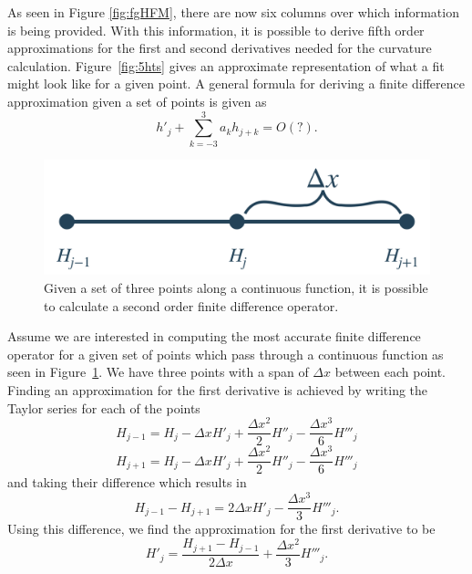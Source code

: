 As seen in Figure \ref{fig:fgHFM}, there are now six columns over which information is being provided. With this information, it is possible to derive fifth order approximations for the first and second derivatives needed for the curvature calculation. Figure~\ref{fig:5hts} gives an approximate representation of what a fit might look like for a given point. A general formula for deriving a finite difference approximation given a set of points is given as 
\begin{equation}
h'_j + \sum_{k=-3}^{3} a_k h_{j+k} = O(?).
\label{eqn:gen}
\end{equation}
\begin{figure}[htbp]
	\centering
	\includegraphics[width=0.5\linewidth]{figs/findiff.png}
	\caption{Given a set of three points along a continuous function, it is possible to calculate a second order finite difference operator.}
	\label{fig:findiff}
\end{figure}
Assume we are interested in computing the most accurate finite difference operator for a given set of points which pass through a continuous function as seen in Figure~\ref{fig:findiff}. We have three points with a span of $\Delta x$ between each point. Finding an approximation for the first derivative is achieved by writing the Taylor series for each of the points
\begin{equation}
H_{j-1} = H_j - \Delta x H'_j + \frac{\Delta x^2}{2} H''_j- \frac{\Delta x^3}{6} H'''_j 
\label{eqn:tay1}
\end{equation}
\begin{equation}
H_{j+1} = H_j - \Delta x H'_j + \frac{\Delta x^2}{2} H''_j- \frac{\Delta x^3}{6} H'''_j
\label{eqn:tay2}
\end{equation}
and taking their difference which results in 
\begin{equation}
H_{j-1} - H_{j+1} = 2\Delta x H'_j - \frac{\Delta x^3}{3} H'''_j.
\label{eqn:diff}
\end{equation}
Using this difference, we find the approximation for the first derivative to be 
\begin{equation}
H'_j = \frac{H_{j+1} - H_{j-1}}{2\Delta x} + \frac{\Delta x^2}{3} H'''_j.
\label{eqn:poly}
\end{equation}

